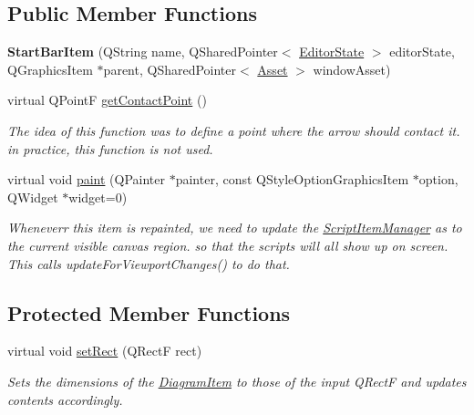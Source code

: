 \subsection*{Public Member Functions}
\begin{DoxyCompactItemize}
\item 
\hypertarget{class_start_bar_item_a87a28c425964a24c8dd0fda9eb8d8aed}{{\bfseries Start\-Bar\-Item} (Q\-String name, Q\-Shared\-Pointer$<$ \hyperlink{class_editor_state}{Editor\-State} $>$ editor\-State, Q\-Graphics\-Item $\ast$parent, Q\-Shared\-Pointer$<$ \hyperlink{class_picto_1_1_asset}{Asset} $>$ window\-Asset)}\label{class_start_bar_item_a87a28c425964a24c8dd0fda9eb8d8aed}

\item 
\hypertarget{class_start_bar_item_a91ef14d7a5395aadc892a933bb5fbf1d}{virtual Q\-Point\-F \hyperlink{class_start_bar_item_a91ef14d7a5395aadc892a933bb5fbf1d}{get\-Contact\-Point} ()}\label{class_start_bar_item_a91ef14d7a5395aadc892a933bb5fbf1d}

\begin{DoxyCompactList}\small\item\em The idea of this function was to define a point where the arrow should contact it. in practice, this function is not used. \end{DoxyCompactList}\item 
\hypertarget{class_start_bar_item_a78c794b44295cce4e1cd95c18756a796}{virtual void \hyperlink{class_start_bar_item_a78c794b44295cce4e1cd95c18756a796}{paint} (Q\-Painter $\ast$painter, const Q\-Style\-Option\-Graphics\-Item $\ast$option, Q\-Widget $\ast$widget=0)}\label{class_start_bar_item_a78c794b44295cce4e1cd95c18756a796}

\begin{DoxyCompactList}\small\item\em Wheneverr this item is repainted, we need to update the \hyperlink{class_script_item_manager}{Script\-Item\-Manager} as to the current visible canvas region. so that the scripts will all show up on screen. This calls update\-For\-Viewport\-Changes() to do that. \end{DoxyCompactList}\end{DoxyCompactItemize}
\subsection*{Protected Member Functions}
\begin{DoxyCompactItemize}
\item 
\hypertarget{class_start_bar_item_a33d5c6b17b0d0d9f27f63d29b9ec5bf0}{virtual void \hyperlink{class_start_bar_item_a33d5c6b17b0d0d9f27f63d29b9ec5bf0}{set\-Rect} (Q\-Rect\-F rect)}\label{class_start_bar_item_a33d5c6b17b0d0d9f27f63d29b9ec5bf0}

\begin{DoxyCompactList}\small\item\em Sets the dimensions of the \hyperlink{class_diagram_item}{Diagram\-Item} to those of the input Q\-Rect\-F and updates contents accordingly. \end{DoxyCompactList}\end{DoxyCompactItemize}
